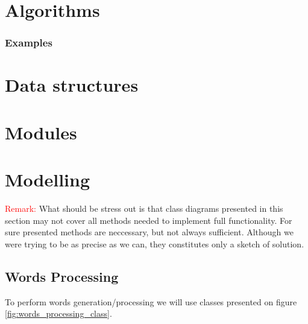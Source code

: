 \documentclass{article}
\begin{document}
\newpage


\section{Algorithms} \label{section:Algorithms}





\subsubsection{Examples}




\section{Data structures}




\section{Modules}
	



\section{Modelling}
\textcolor{red}{Remark:} What should be stress out is that class diagrams presented in this section may not cover all methods needed to implement full functionality. For sure presented methods are neccessary, but not always sufficient. Although we were trying to be as precise as we can, they constitutes only a sketch of solution.





%
%
\newpage
\subsection{Words Processing}
To perform words generation/processing we will use classes presented on figure \ref{fig:words_processing_class}.
\end{document}

